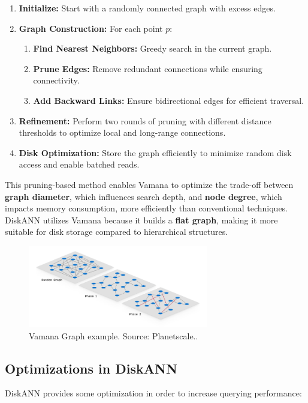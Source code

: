 \begin{enumerate}
    \item \textbf{Initialize:}  
    Start with a randomly connected graph with excess edges.  

    \item \textbf{Graph Construction:}  
    For each point $p$:  
    \begin{enumerate}
        \item \textbf{Find Nearest Neighbors:} Greedy search in the current graph.  
        \item \textbf{Prune Edges:} Remove redundant connections while ensuring connectivity.  
        \item \textbf{Add Backward Links:} Ensure bidirectional edges for efficient traversal.  
    \end{enumerate}

    \item \textbf{Refinement:}  
    Perform two rounds of pruning with different distance thresholds to optimize local and long-range connections.  

    \item \textbf{Disk Optimization:}  
    Store the graph efficiently to minimize random disk access and enable batched reads.  
\end{enumerate}
This pruning-based method enables Vamana to optimize the trade-off between \textbf{graph diameter}, which influences search depth, and \textbf{node degree}, which impacts memory consumption, more efficiently than conventional techniques. DiskANN utilizes Vamana because it builds a \textbf{flat graph}, making it more suitable for disk storage compared to hierarchical structures.
\begin{figure}[h]
    \centering
\includegraphics[width=0.7\textwidth]{IMAGES/immagine_2025-02-27_134619701.png}
    \caption{Vamana Graph example. Source: Planetscale.\footnotemark.}
    \label{fig:Vamana}
\end{figure}
\subsection{Optimizations in DiskANN}
DiskANN provides some optimization in order to increase querying performance:


